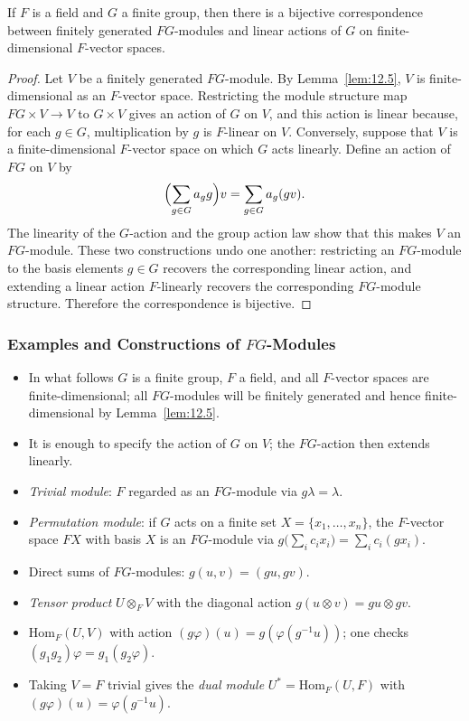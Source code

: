 \documentclass[../Odyssey_Project.tex]{subfiles}
\begin{document}
\begin{proposition}
\label{prop:12.6}
If $F$ is a field and $G$ a finite group, then there is a bijective correspondence between finitely generated $FG$-modules and linear actions of $G$ on finite-dimensional $F$-vector spaces.
\end{proposition}
\begin{proof}
    Let $V$ be a finitely generated $FG$-module. By Lemma~\ref{lem:12.5}, $V$ is finite-dimensional as an $F$-vector space. Restricting the module structure map $FG \times V \to V$ to $G \times V$ gives an action of $G$ on $V$, and this action is linear because, for each $g \in G$, multiplication by $g$ is $F$-linear on $V$. Conversely, suppose that $V$ is a finite-dimensional $F$-vector space on which $G$ acts linearly. Define an action of $FG$ on $V$ by
    \[
        \Bigl(\sum_{g \in G} a_g g\Bigr)v = \sum_{g \in G} a_g(gv).
    \]
    The linearity of the $G$-action and the group action law show that this makes $V$ an $FG$-module. These two constructions undo one another: restricting an $FG$-module to the basis elements $g \in G$ recovers the corresponding linear action, and extending a linear action $F$-linearly recovers the corresponding $FG$-module structure. Therefore the correspondence is bijective.
\end{proof}

\subsubsection*{Examples and Constructions of \texorpdfstring{$FG$}{FG}-Modules}
\begin{itemize}
    \item In what follows $G$ is a finite group, $F$ a field, and all $F$-vector spaces are finite-dimensional; all $FG$-modules will be finitely generated and hence finite-dimensional by Lemma~\ref{lem:12.5}.
    \item It is enough to specify the action of $G$ on $V$; the $FG$-action then extends linearly.
    \item \emph{Trivial module}: $F$ regarded as an $FG$-module via $g \lambda = \lambda$.
    \item \emph{Permutation module}: if $G$ acts on a finite set $X = \{x_1, \ldots, x_n\}$, the $F$-vector space $FX$ with basis $X$ is an $FG$-module via $g\bigl(\sum_i c_i x_i\bigr) = \sum_i c_i (g x_i)$.
    \item Direct sums of $FG$-modules: $g(u, v) = (gu, gv)$.
    \item \emph{Tensor product} $U \otimes_F V$ with the diagonal action $g(u \otimes v) = gu \otimes gv$.
    \item $\mathrm{Hom}_F(U, V)$ with action $(g\varphi)(u) = g(\varphi(g^{-1} u))$; one checks $(g_1 g_2)\varphi = g_1(g_2 \varphi)$.
    \item Taking $V = F$ trivial gives the \emph{dual module} $U^* = \mathrm{Hom}_F(U, F)$ with $(g\varphi)(u) = \varphi(g^{-1} u)$.
\end{itemize}
\end{document}
